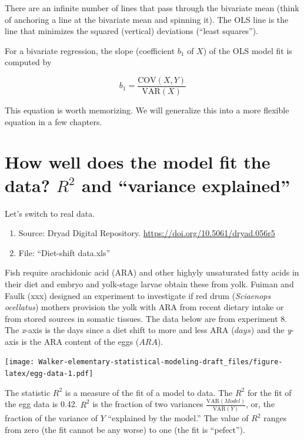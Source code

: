 \documentclass[]{book}
\providecommand{\tightlist}{%
  \setlength{\itemsep}{0pt}\setlength{\parskip}{0pt}}
\begin{document}
There are an infinite number of lines that pass through the bivariate
mean (think of anchoring a line at the bivariate mean and spinning it).
The OLS line is the line that minimizes the squared (vertical)
deviations (``least squares'').

For a bivariate regression, the slope (coefficient \(b_1\) of \(X\)) of
the OLS model fit is computed by

\begin{equation}
b_1 = \frac{\mathrm{COV}(X, Y)}{\mathrm{VAR}(X)}
\end{equation}

This equation is worth memorizing. We will generalize this into a more
flexible equation in a few chapters.

\section{\texorpdfstring{How well does the model fit the data? \(R^2\)
and ``variance
explained''}{How well does the model fit the data? R\^{}2 and variance explained}}\label{how-well-does-the-model-fit-the-data-r2-and-variance-explained}

Let's switch to real data.

\begin{enumerate}
\def\labelenumi{\arabic{enumi}.}
\tightlist
\item
  Source: Dryad Digital Repository.
  \url{https://doi.org/10.5061/dryad.056r5}
\item
  File: ``Diet-shift data.xls''
\end{enumerate}

Fish require arachidonic acid (ARA) and other highyly unsaturated fatty
acids in their diet and embryo and yolk-stage larvae obtain these from
yolk. Fuiman and Faulk (xxx) designed an experiment to investigate if
red drum (\emph{Sciaenops ocellatus}) mothers provision the yolk with
ARA from recent dietary intake or from stored sources in somatic
tissues. The data below are from experiment 8. The \emph{x}-axis is the
days since a diet shift to more and less ARA (\(days\)) and the
\emph{y}-axis is the ARA content of the eggs (\(ARA\)).

\texttt{[image: Walker-elementary-statistical-modeling-draft\_files/figure-latex/egg-data-1.pdf]}

The statistic \(R^2\) is a measure of the fit of a model to data. The
\(R^2\) for the fit of the egg data is 0.42. \(R^2\) is the fraction of
two variances \(\frac{\mathrm{VAR}(Model)}{\mathrm{VAR}(Y)}\), or, the
fraction of the variance of \(Y\) ``explained by the model.'' The value
of \(R^2\) ranges from zero (the fit cannot be any worse) to one (the
fit is ``pefect'').
\end{document}
